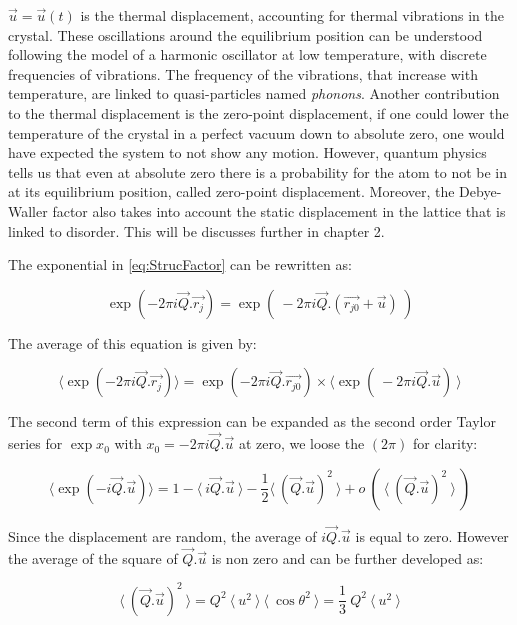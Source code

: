 $\vec{u} = \vec{u}(t)$ is the thermal displacement, accounting for thermal vibrations in the crystal. These oscillations around the equilibrium position can be understood following the model of a harmonic oscillator at low temperature, with discrete frequencies of vibrations. The frequency of the vibrations, that increase with temperature, are linked to quasi-particles named \textit{phonons}.
Another contribution to the thermal displacement is the zero-point displacement, if one could lower the temperature of the crystal in a perfect vacuum down to absolute zero, one would have expected the system to not show any motion. However, quantum physics tells us that even at absolute zero there is a probability for the atom to not be in at its equilibrium position, called zero-point displacement.
Moreover, the Debye-Waller factor also takes into account the static displacement in the lattice that is linked to disorder. This will be discusses further in chapter 2.

The exponential in \eqref{eq:StrucFactor} can be rewritten as:

\begin{equation}
    \exp{(-2\pi i \vec{Q}.\vec{r_j})} = \exp{(\ -2\pi i \vec{Q}.(\vec{r_{j0}} + \vec{u})\ )}
\end{equation}{}

The average of this equation is given by:

\begin{equation}
    \langle \exp{(-2\pi i \vec{Q}.\vec{r_j})} \rangle= \exp{(-2\pi i \vec{Q}.\vec{r_{j0}})} \times \langle \exp{(\ -2\pi i \vec{Q}.\vec{u})\ }\rangle
\end{equation}{}

The second term of this expression can be expanded as the second order Taylor series for $\exp{x_0}$ with $x_0 = -2\pi i \vec{Q}.\vec{u}$ at zero, we loose the $(2\pi)$ for clarity:

\begin{equation}
    \langle \exp{(- i \vec{Q}.\vec{u})}\rangle = 1 - \langle \ i \vec{Q}.\vec{u} \ \rangle - \frac{1}{2} \langle \ (\vec{Q}.\vec{u})^2 \ \rangle + o \ ( \ \langle \ (\vec{Q}.\vec{u})^2 \ \rangle \ )
\end{equation}

Since the displacement are random, the average of $i \vec{Q}.\vec{u}$ is equal to zero. However the average of the square of $\vec{Q}.\vec{u}$ is non zero and can be further developed as:

\begin{equation}
    \langle \ (\vec{Q}.\vec{u})^2 \ \rangle = Q^2 \ \langle \ u^2 \ \rangle \  \langle \ \cos{\theta}^2 \ \rangle = \frac{1}{3} \  Q^2 \ \langle \ u^2 \ \rangle
\end{equation}{}

